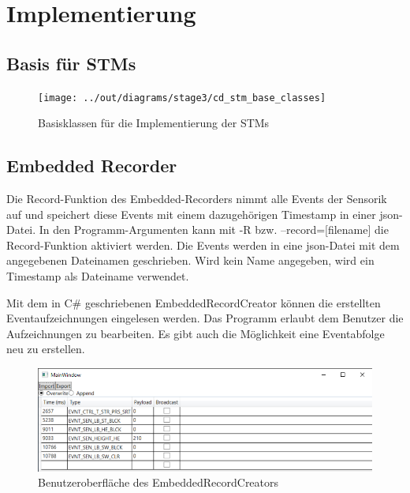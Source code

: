 \chapter{Implementierung}\label{ch:implementierung}


\section{Basis für STMs}\label{sec:basis-fuer-stms}

\begin{figure}[h]
    \centering
    \texttt{[image: ../out/diagrams/stage3/cd\_stm\_base\_classes]}
    \caption{Basisklassen für die Implementierung der STMs}
    \label{fig:cd-stm-base}
\end{figure}



\section{Embedded Recorder}\label{sec:embedded-recorder}

Die Record-Funktion des Embedded-Recorders nimmt alle Events der Sensorik auf und
speichert diese Events mit einem dazugehörigen Timestamp in einer json-Datei.
In den Programm-Argumenten kann mit -R bzw. --record=[filename] die Record-Funktion aktiviert werden.
Die Events werden in eine json-Datei mit dem angegebenen Dateinamen geschrieben.
Wird kein Name angegeben, wird ein Timestamp als Dateiname verwendet.

Mit dem in C\# geschriebenen EmbeddedRecordCreator können die erstellten Eventaufzeichnungen eingelesen werden.
Das Programm erlaubt dem Benutzer die Aufzeichnungen zu bearbeiten.
Es gibt auch die Möglichkeit eine Eventabfolge neu zu erstellen.

\begin{figure}[h]
    \centering
    \includegraphics[scale = 0.7]{anhang/EmbeddedRecordCreator.PNG}
    \caption{Benutzeroberfläche des EmbeddedRecordCreators}
    \label{fig:embedded-record-creator}
\end{figure}

